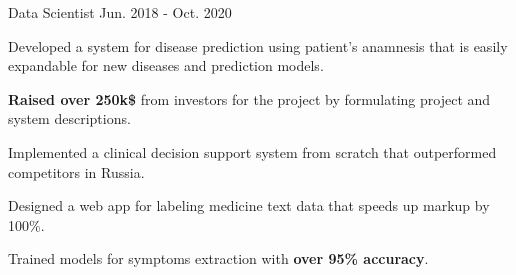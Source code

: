 \begin{cventries}
\cventry
{Data Scientist} %
{} %
{} %
{Jun. 2018 - Oct. 2020} %
{
  \begin{cvitems} %
    \item {Developed a system for disease prediction using patient's anamnesis that is easily expandable for new diseases and prediction models.}
    \item {\textbf{Raised over 250k\$} from investors for the project by formulating project and system descriptions.}
    \item {Implemented a clinical decision support system from scratch that outperformed competitors in Russia.}
    \item {Designed a web app for labeling medicine text data that speeds up markup by 100\%.}
    \item {Trained models for symptoms extraction with \textbf{over 95\% accuracy}.}
  \end{cvitems}
}



\end{cventries}
